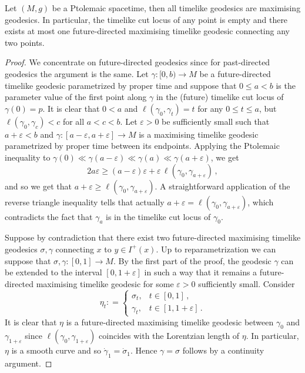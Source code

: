 \documentclass[10pt,a4paper]{amsart}
\begin{document}
\begin{lemma}
\label{lem: Ptolemy imply maximising}
Let $(M,g)$ be a Ptolemaic spacetime, then all timelike geodesics are maximising geodesics. 
In particular, the timelike cut locus of any point is empty and there exists at most one future-directed maximising timelike geodesic connecting any two points.
\end{lemma}

\begin{proof}
We concentrate on future-directed geodesics since for past-directed geodesics the argument is the same. 
Let $\gamma :[0,b) \rightarrow M$ be a future-directed timelike geodesic parametrized by proper time and suppose that $0 \leq a < b$ is the parameter value of the first point along $\gamma$ in the (future) timelike cut locus of $\gamma(0) =p$. 
It is clear that $0<a$ and $\ell(\gamma_0, \gamma_t) = t$ for any $0 \leq t \leq a$, but 
$\ell(\gamma_0, \gamma_c) <c$ for all $a<c < b$. Let $\varepsilon>0$ be sufficiently small such that $a+ \varepsilon <b$ and $\gamma : [a- \varepsilon, a + \varepsilon ] \rightarrow M$ is a maximising timelike geodesic parametrized by proper time between its endpoints. 
Applying the Ptolemaic inequality to $\gamma(0) \ll \gamma(a-\varepsilon) \ll \gamma(a) \ll \gamma(a+ \varepsilon)$, we get
\[
2a \varepsilon \geq (a-\varepsilon) \varepsilon + \varepsilon \, \ell( \gamma_0, \gamma _{a+ \varepsilon}) \, ,
\]
and so we get that $a+ \varepsilon \geq \ell(\gamma_0, \gamma_{a+ \varepsilon})$. A straightforward application of the reverse triangle inequality tells that actually $a+ \varepsilon = \ell(\gamma_0, \gamma_{a+ \varepsilon})$, which contradicts the fact that $\gamma_a$ is in the timelike cut locus of $\gamma_0$. 

Suppose by contradiction that there exist two future-directed maximising timelike geodesics $\sigma, \gamma$ connecting $x$ to $y \in I^+(x)$. 
Up to reparametrization we can suppose that $\sigma, \gamma : [0,1] \rightarrow M$. 
By the first part of the proof, the geodesic $\gamma$ can be extended to the interval $[0, 1 + \varepsilon]$ in such a way that it remains a future-directed maximising timelike geodesic for some $\varepsilon >0$ sufficiently small. 
Consider
\[
\eta _t : = \begin{cases}
\sigma_t, & t \in [0,1] \, ,\\
\gamma_t, & t \in [1, 1+ \varepsilon] \, .
\end{cases}
\]
It is clear that $\eta$ is a future-directed maximising timelike geodesic between $\gamma_0$ and $\gamma _{1+ \varepsilon}$ since $\ell(\gamma_0, \gamma_{1+\varepsilon})$ coincides with the Lorentzian length of $\eta$. 
In particular, $\eta$ is a smooth curve and so $\dot \gamma _1= \dot \sigma _1$. Hence $\gamma= \sigma$ follows by a continuity argument.
\end{proof}
\end{document}
